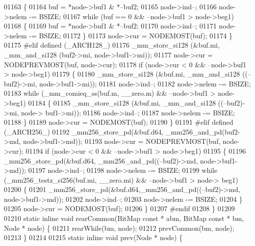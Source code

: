 \begin{DoxyCode}
01163     \{
01164         buf = *node->buf1 & *--buf2;
01165                 node->ind--;
01166                 node->nelem -= BSIZE;
01167         \textcolor{keywordflow}{while} (buf == 0 && --node->buf1 > node->beg1)
01168         \{
01169             buf = *node->buf1 & *--buf2;
01170                 node->ind--;
01171                 node->nelem -= BSIZE;
01172         \}
01173         node->cur = NODEMOST(buf);
01174     \}
01175 \textcolor{preprocessor}{#elif defined (\_ARCH128\_)}
01176     \_mm\_store\_si128 (&buf.mi, \_mm\_and\_si128 (buf2->mi, node->buf1->mi));
01177     node->cur = NODEPREVMOST(buf, node->cur);
01178     \textcolor{keywordflow}{if} (node->cur < 0 && --node->buf1 > node->beg1)
01179     \{
01180         \_mm\_store\_si128 (&buf.mi, \_mm\_and\_si128 ((--buf2)->mi, node->buf1->mi));
01181                 node->ind--;
01182                 node->nelem -= BSIZE;
01183         \textcolor{keywordflow}{while} (\_mm\_comieq\_ss(buf.m, \_\_zero.m) && --node->buf1 > node->beg1)
01184         \{
01185                 \_mm\_store\_si128 (&buf.mi, \_mm\_and\_si128 ((--buf2)->mi, node->
      buf1->mi));
01186                 node->ind--;
01187                 node->nelem -= BSIZE;
01188         \}
01189         node->cur = NODEMOST(buf);
01190     \}
01191 \textcolor{preprocessor}{#elif defined (\_ARCH256\_)}
01192         \_mm256\_store\_pd(&buf.d64, \_mm256\_and\_pd(buf2->md, node->buf1->md));
01193     node->cur = NODEPREVMOST(buf, node->cur);
01194     \textcolor{keywordflow}{if} (node->cur < 0 && --node->buf1 > node->beg1)
01195     \{
01196         \_mm256\_store\_pd(&buf.d64, \_mm256\_and\_pd((--buf2)->md, node->buf1->md));
01197                 node->ind--;
01198                 node->nelem -= BSIZE;
01199         \textcolor{keywordflow}{while} (\_mm256\_testz\_si256(buf.mi, \_\_zero.mi) && --node->buf1 > node->
      beg1)
01200         \{
01201                 \_mm256\_store\_pd(&buf.d64,\_mm256\_and\_pd((--buf2)->md, node->buf1->md));
01202                 node->ind--;
01203                 node->nelem -= BSIZE;
01204         \}
01205         node->cur = NODEMOST(buf);
01206     \}
01207 \textcolor{preprocessor}{#endif}
01208 \}
01209 
01210 \textcolor{keyword}{static} \textcolor{keyword}{inline} \textcolor{keywordtype}{void} rearCommon(BitMap \textcolor{keyword}{const} * abm, BitMap \textcolor{keyword}{const} * bm, Node * node) \{
01211         rearWhile(bm, node);
01212         prevCommon(bm, node);
01213 \}
01214 
01215 \textcolor{keyword}{static} \textcolor{keyword}{inline} \textcolor{keywordtype}{void} prev(Node * node) \{

\end{DoxyCode}
